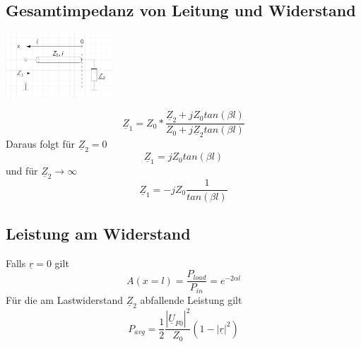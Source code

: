 \documentclass[11pt]{scrartcl}
\def\Uc{\underline{\hat U}}
\begin{document}
\subsection{Gesamtimpedanz von Leitung und Widerstand}
\begin{center}
	\includegraphics[width=0.3\textwidth]{Grafiken/02_Leitungsimpedanz.png}
\end{center}
\begin{equation*}
	\underline{Z}_1 = Z_0*\frac{\underline{Z}_2+jZ_0tan(\beta l)}{Z_0+j\underline{Z}_2tan(\beta l)}
\end{equation*}
Daraus folgt für $\underline{Z}_2 = 0$
\begin{equation*}
	\underline{Z}_1 = jZ_0tan(\beta l)
\end{equation*}
und für $\underline{Z}_2\rightarrow\infty$
\begin{equation*}
	\underline{Z}_1 = -jZ_0\frac{1}{tan(\beta l)}
\end{equation*}
\subsection{Leistung am Widerstand}
Falls $\underline{r} = 0$ gilt
\begin{equation*}
	A(x=l) = \frac{P_{load}}{P_{in}} = e^{-2\alpha l}
\end{equation*}
 Für die am Lastwiderstand $\underline{Z}_2$ abfallende Leistung gilt
 \begin{equation*}
 	P_{avg} = \frac{1}{2}\frac{|\Uc_{F0}|^2}{Z_0}(1-|\underline{r}|^2)
 \end{equation*}
\end{document}
